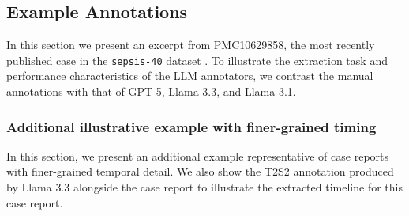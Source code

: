 \subsection{Example Annotations}\label{ch06:apd:excerpt}
In this section we present an excerpt from PMC10629858, the most recently published case in the \texttt{sepsis-40} dataset \citep{abu2023rare}.
To illustrate the extraction task and performance characteristics of the LLM annotators, we contrast the manual annotations with that of GPT-5, Llama 3.3, and Llama 3.1.















\FloatBarrier
\subsubsection{Additional illustrative example with finer-grained timing}

In this section, we present an additional example representative of case reports with finer-grained temporal detail.
We also show the T2S2 annotation produced by Llama 3.3 alongside the case report to illustrate the extracted timeline for this case report.

\label{ch06:apd:fine_example}







\FloatBarrier
